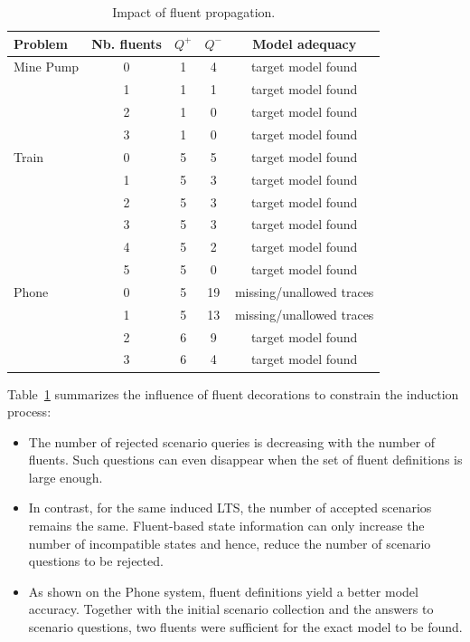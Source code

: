 \begin{table}[H]
\centering
\begin{tabular}{|l||c||c|c|c|}\hline
Problem&Nb. fluents&$Q^+$&$Q^-$&Model adequacy\\\hline\hline
Mine Pump&0&1&4&target model found\\\cline{2-5}
&1&1&1&target model found\\\cline{2-5}
&2&1&0&target model found\\\cline{2-5}
&3&1&0&target model found\\\hline\hline
Train&0&5&5&target model found\\\cline{2-5}
&1&5&3&target model found\\\cline{2-5}
&2&5&3&target model found\\\cline{2-5}
&3&5&3&target model found\\\cline{2-5}
&4&5&2&target model found\\\cline{2-5}
&5&5&0&target model found\\\hline\hline
Phone&0&5&19&missing/unallowed traces\\\cline{2-5}
&1&5&13&missing/unallowed traces\\\cline{2-5}
&2&6&9&target model found\\\cline{2-5}
&3&6&4&target model found\\\hline
\end{tabular}
\caption{Impact of fluent propagation.\label{Fluents:res}}
\end{table}

Table~\ref{Fluents:res} summarizes the influence of fluent decorations to constrain the induction process:
\begin{itemize}
\item The number of rejected scenario queries is decreasing with the number of fluents. Such questions can even disappear when the set of fluent definitions is large enough. 
\item In contrast, for the same induced LTS, the number of accepted scenarios remains the same. Fluent-based state information can only increase the number of incompatible states and hence, reduce the number of scenario questions to be rejected.
\item As shown on the Phone system, fluent definitions yield a better model accuracy. Together with the initial scenario collection and the answers to scenario questions, two fluents were sufficient for the exact model to be found.
\end{itemize}


